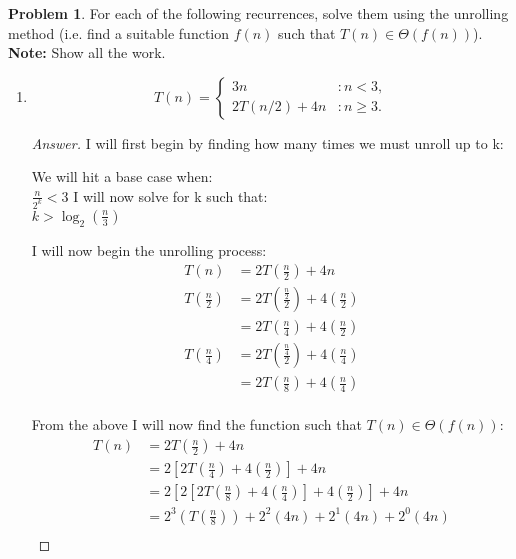 \documentclass[11pt]{article}
\theoremstyle{definition}
\theoremstyle{definition}
\newtheorem{required}{Problem}
\theoremstyle{definition}
\begin{document}
\begin{required} \label{unrolling}
For each of the following recurrences, solve them using the unrolling method (i.e. find a suitable function $f(n)$ such that $T(n) \in \Theta(f(n))$). \textbf{Note: } Show all the work.

\renewcommand{\theenumi}{\alph{enumi}}
\begin{enumerate}
\subsection{Problem 17(a)}
\item 
$$
T(n) = \begin{cases}
3n & : n < 3, \\
2T(n / 2) + 4n & : n \geq 3.
\end{cases}
$$

\begin{proof}[Answer]
I will first begin by finding how many times we must unroll up to k: \\
\begin{center}
We will hit a base case when: \\
$\frac{n}{2^k} < 3$
I will now solve for k such that: \\
$k > \log_2 (\frac{n}{3})$ \\
\end{center} 

I will now begin the unrolling process: \\
\begin{align*}
T(n) &= 2T(\frac{n}{2}) + 4n  \\
T(\frac{n}{2}) &= 2T(\frac{\frac{n}{2}}{2}) + 4(\frac{n}{2})  \\
&= 2T(\frac{n}{4}) + 4(\frac{n}{2}) \\
T(\frac{n}{4}) &= 2T(\frac{\frac{n}{4}}{2}) + 4(\frac{n}{4})  \\
&= 2T(\frac{n}{8}) + 4(\frac{n}{4}) \\
\end{align*}

From the above I will now find the function such that $T(n) \in \Theta(f(n))$: \\
\begin{align*}
T(n) &= 2T(\frac{n}{2}) + 4n  \\
&= 2[ 2T(\frac{n}{4}) + 4(\frac{n}{2}) ] + 4n \\
&= 2[2[2T(\frac{n}{8}) + 4(\frac{n}{4}) ] +4(\frac{n}{2})] + 4n \\
&= 2^{3}(T(\frac{n}{8})) + 2^{2}(4n) + 2^{1}(4n) + 2^{0}(4n) \\
\end{align*}


\end{proof}
\end{enumerate}
\end{required}
\end{document}
